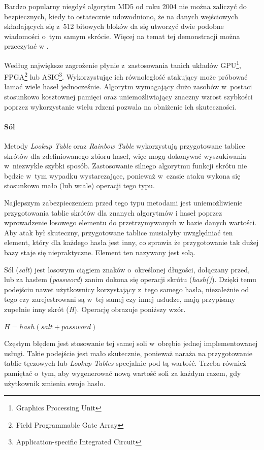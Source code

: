 \documentclass[11pt]{aghdpl}
\begin{document}
Bardzo popularny niegdyś algorytm MD5 od roku 2004 nie można zaliczyć do bezpiecznych, kiedy to ostatecznie udowodniono, że na danych wejściowych składających się z~512 bitowych bloków da się utworzyć dwie podobne wiadomości o~tym samym skrócie. Więcej na temat tej demonstracji można przeczytać w \cite{Md5C06}.

Według \cite{RIG} największe zagrożenie płynie z~zastosowania tanich układów GPU\footnote{Graphics Processing Unit}, FPGA\footnote{Field Programmable Gate Array} lub ASIC\footnote{Application-specific Integrated Circuit}. Wykorzystując ich równoległość atakujący może próbować łamać wiele haseł jednocześnie. Algorytm wymagający dużo zasobów w~postaci stosunkowo kosztownej pamięci oraz uniemożliwiający znaczny wzrost szybkości poprzez wykorzystanie wielu rdzeni pozwala na obniżenie ich skuteczności. 

\paragraph{Sól}
\label{sec:sol}

Metody \emph{Lookup Table} oraz \emph{Rainbow Table} wykorzystują przygotowane tablice skrótów dla zdefiniowanego zbioru haseł, więc mogą dokonywać wyszukiwania w~niezwykle szybki sposób. Zastosowanie silnego algorytmu funkcji skrótu nie będzie w~tym wypadku wystarczające, ponieważ w~czasie ataku wykona się stosunkowo mało (lub wcale) operacji tego typu.

Najlepszym zabezpieczeniem przed tego typu metodami jest uniemożliwienie przygotowania tablic skrótów dla znanych algorytmów i haseł poprzez wprowadzenie losowego elementu do przetrzymywanych w bazie danych wartości. Aby atak był skuteczny, przygotowane tablice musiałyby uwzględniać ten element, który dla każdego hasła jest inny, co sprawia że przygotowanie tak dużej bazy staje się niepraktyczne. Element ten nazywany jest solą.

Sól (\emph{salt}) jest losowym ciągiem znaków o~określonej długości, dołączany przed, lub za hasłem (\emph{password}) zanim dokona się operacji skrótu (\emph{hash()}). Dzięki temu podejściu nawet użytkownicy korzystający z~tego samego hasła, niezależnie od tego czy zarejestrowani są w~tej samej czy innej usłudze, mają przypisany zupełnie inny skrót (\emph{H}). Operację obrazuje poniższy wzór.

$H = hash(salt + password)$

Częstym błędem jest stosowanie tej samej soli w~obrębie jednej implementowanej usługi. Takie podejście jest mało skutecznie, ponieważ naraża na przygotowanie tablic tęczowych lub \emph{Lookup Tables} specjalnie pod tą wartość. Trzeba również pamiętać o~tym, aby wygenerować nową wartość soli za każdym razem, gdy użytkownik zmienia swoje hasło.
\end{document}
